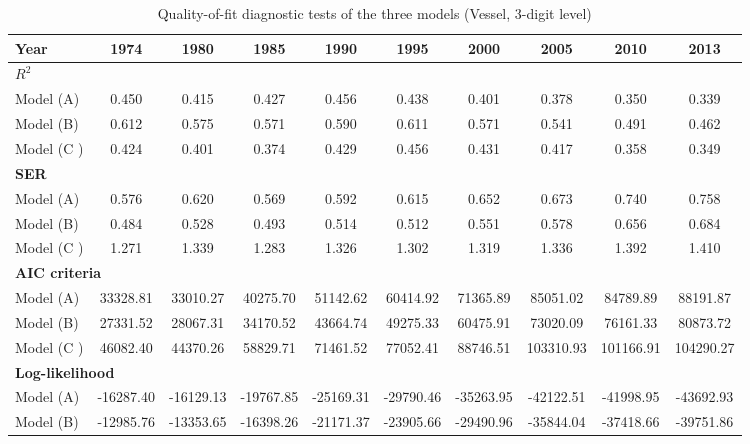\documentclass[11pt,twoside, authoryear]{elsarticle}
\begin{document}
\begin{landscape}
\begin{table}[htbp]
  \centering
  \footnotesize{
  \caption{Quality-of-fit diagnostic tests of the three models (Vessel, 3-digit level)}
    \label{tab:3models_diagnosis_vessel}%
   \begin{tabular}{l|c c c c c c c c c}
    \hline \hline
    \textbf{Year} & \multicolumn{1}{c}{\textbf{1974}} & \multicolumn{1}{c}{\textbf{1980}} & \multicolumn{1}{c}{\textbf{1985}} & \multicolumn{1}{c}{\textbf{1990}} & \multicolumn{1}{c}{\textbf{1995}} & \multicolumn{1}{c}{\textbf{2000}} & \multicolumn{1}{c}{\textbf{2005}} & \multicolumn{1}{c}{\textbf{2010}} & \multicolumn{1}{c}{\textbf{2013}} \\ \hline
    \multicolumn{10}{l}{\textbf{$R^2$}} \\ \hline
    Model (A) & 0.450 & 0.415 & 0.427 & 0.456 & 0.438 & 0.401 & 0.378 & 0.350 & 0.339 \\
    Model (B) & 0.612 & 0.575 & 0.571 & 0.590 & 0.611 & 0.571 & 0.541 & 0.491 & 0.462 \\
    Model (C ) & 0.424 & 0.401 & 0.374 & 0.429 & 0.456 & 0.431 & 0.417 & 0.358 & 0.349 \\ \hline
    \multicolumn{10}{l}{\textbf{SER} } \\ \hline
    Model (A) & 0.576 & 0.620 & 0.569 & 0.592 & 0.615 & 0.652 & 0.673 & 0.740 & 0.758 \\
    Model (B) & 0.484 & 0.528 & 0.493 & 0.514 & 0.512 & 0.551 & 0.578 & 0.656 & 0.684 \\
    Model (C ) & 1.271 & 1.339 & 1.283 & 1.326 & 1.302 & 1.319 & 1.336 & 1.392 & 1.410 \\ \hline
    \multicolumn{10}{l}{\textbf{AIC criteria} } \\ \hline
    Model (A) & 33328.81 & 33010.27 & 40275.70 & 51142.62 & 60414.92 & 71365.89 & 85051.02 & 84789.89 & 88191.87 \\
    Model (B) & 27331.52 & 28067.31 & 34170.52 & 43664.74 & 49275.33 & 60475.91 & 73020.09 & 76161.33 & 80873.72 \\
    Model (C ) & 46082.40 & 44370.26 & 58829.71 & 71461.52 & 77052.41 & 88746.51 & 103310.93 & 101166.91 & 104290.27 \\ \hline
    \multicolumn{10}{l}{\textbf{Log-likelihood}}\\ \hline
    Model (A) & -16287.40 & -16129.13 & -19767.85 & -25169.31 & -29790.46 & -35263.95 & -42122.51 & -41998.95 & -43692.93 \\
    Model (B) & -12985.76 & -13353.65 & -16398.26 & -21171.37 & -23905.66 & -29490.96 & -35844.04 & -37418.66 & -39751.86 \\

\end{tabular}}
\end{table}
\end{landscape}
\end{document}
